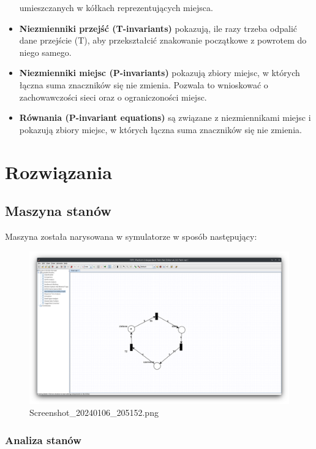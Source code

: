 \documentclass[11pt]{article}
\begin{document}
\begin{itemize}
  umieszczanych w kółkach reprezentujących miejsca.
\item
  \textbf{Niezmienniki przejść (T-invariants)} pokazują, ile razy trzeba
  odpalić dane przejście (T), aby przekształcić znakowanie początkowe z
  powrotem do niego samego.
\item
  \textbf{Niezmienniki miejsc (P-invariants)} pokazują zbiory miejsc, w
  których łączna suma znaczników się nie zmienia. Pozwala to wnioskować
  o zachowawczości sieci oraz o ograniczoności miejsc.
\item
  \textbf{Równania (P-invariant equations)} są związane z niezmiennikami
  miejsc i pokazują zbiory miejsc, w których łączna suma znaczników się
  nie zmienia.
\end{itemize}

    \hypertarget{rozwiux105zania}{%
\section{Rozwiązania}\label{rozwiux105zania}}

    \hypertarget{maszyna-stanuxf3w}{%
\subsection{Maszyna stanów}\label{maszyna-stanuxf3w}}

    Maszyna została narysowana w symulatorze w sposób następujący:

\begin{figure}
\centering
\includegraphics{Screenshot_20240106_205152.png}
\caption{Screenshot\_20240106\_205152.png}
\end{figure}

\hypertarget{analiza-stanuxf3w}{%
\subsubsection{Analiza stanów}\label{analiza-stanuxf3w}}
\end{document}
